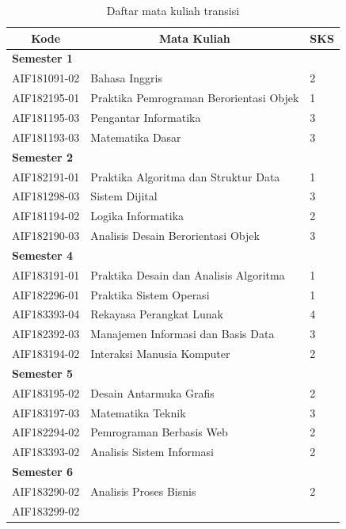 \begin{table}[H]
	\centering
		\caption{Daftar mata kuliah transisi}
		\begin{tabular}{|p{2.85cm}|p{7.95cm}|p{1.75cm}|}
			\hline
			\multicolumn{1}{|c|}{\textbf{Kode}} & \multicolumn{1}{c|}{\textbf{Mata Kuliah}} & \multicolumn{1}{c|}{\textbf{SKS}} \\ \hline
			\multicolumn{3}{|l|}{\textbf{Semester 1}}                    \\ \hline
AIF181091-02 & Bahasa Inggris                          & 2   \\ \hline
AIF182195-01 & Praktika Pemrograman Berorientasi Objek & 1   \\ \hline
AIF181195-03 & Pengantar Informatika                   & 3   \\ \hline
AIF181193-03 & Matematika Dasar                        & 3   \\ \hline
\multicolumn{3}{|l|}{\textbf{Semester 2}}                    \\ \hline
AIF182191-01 & Praktika Algoritma dan Struktur Data    & 1   \\ \hline
AIF181298-03 & Sistem Dijital                          & 3   \\ \hline
AIF181194-02 & Logika Informatika                      & 2   \\ \hline
AIF182190-03 & Analisis Desain Berorientasi  Objek     & 3   \\ \hline
\multicolumn{3}{|l|}{\textbf{Semester 4}}                    \\ \hline
AIF183191-01 & Praktika Desain dan Analisis Algoritma  & 1   \\ \hline
AIF182296-01 & Praktika Sistem Operasi                 & 1   \\ \hline
AIF183393-04 & Rekayasa Perangkat Lunak                & 4   \\ \hline
AIF182392-03 & Manajemen Informasi dan Basis Data      & 3   \\ \hline
AIF183194-02 & Interaksi Manusia Komputer              & 2   \\ \hline
\multicolumn{3}{|l|}{\textbf{Semester 5}}                    \\ \hline
AIF183195-02 & Desain Antarmuka Grafis                 & 2   \\ \hline
AIF183197-03 & Matematika Teknik                       & 3   \\ \hline
AIF182294-02 & Pemrograman Berbasis Web                & 2   \\ \hline
AIF183393-02 & Analisis Sistem Informasi               & 2   \\ \hline
\multicolumn{3}{|l|}{\textbf{Semester 6}}                    \\ \hline
AIF183290-02 & Analisis Proses Bisnis                  & 2   \\ \hline
AIF183299-02


\end{tabular}
\end{table}
